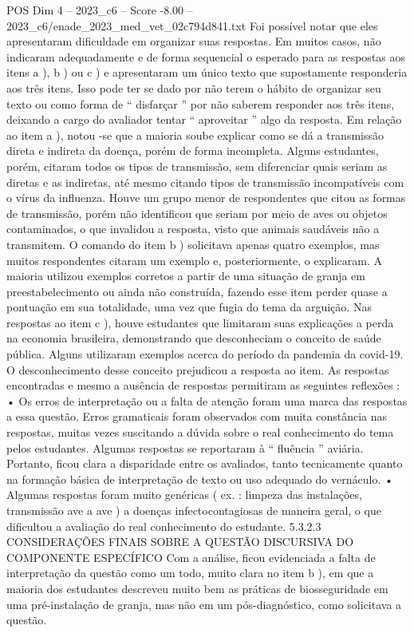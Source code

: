 \begin{textsample}{POS Dim 4 – 2023\_c6 – Score -8.00 – 2023\_c6/enade\_2023\_med\_vet\_02c794d841.txt}
Foi possível notar que eles apresentaram dificuldade em organizar suas respostas.
Em muitos casos, não indicaram adequadamente e de forma sequencial o esperado para as respostas aos itens a ), b ) ou c ) e apresentaram um único texto que supostamente responderia aos três itens.
Isso pode ter se dado por não terem o hábito de organizar seu texto ou como forma de “ disfarçar ” por não saberem responder aos três itens, deixando a cargo do avaliador tentar “ aproveitar ” algo da resposta.
Em relação ao item a ), notou -se que a maioria soube explicar como se dá a transmissão direta e indireta da doença, porém de forma incompleta.
Alguns estudantes, porém, citaram todos os tipos de transmissão, sem diferenciar quais seriam as diretas e as indiretas, até mesmo citando tipos de transmissão incompatíveis com o vírus da influenza.
Houve um grupo menor de respondentes que citou as formas de transmissão, porém não identificou que seriam por meio de aves ou objetos contaminados, o que invalidou a resposta, visto que animais saudáveis não a transmitem.
O comando do item b ) solicitava apenas quatro exemplos, mas muitos respondentes citaram um exemplo e, posteriormente, o explicaram.
A maioria utilizou exemplos corretos a partir de uma situação de granja em preestabelecimento ou ainda não construída, fazendo esse item perder quase a pontuação em sua totalidade, uma vez que fugia do tema da arguição.
Nas respostas ao item c ), houve estudantes que limitaram suas explicações a perda na economia brasileira, demonstrando que desconheciam o conceito de saúde pública.
Alguns utilizaram exemplos acerca do período da pandemia da covid-19.
O desconhecimento desse conceito prejudicou a resposta ao item.
As respostas encontradas e mesmo a ausência de respostas permitiram as seguintes reflexões : • Os erros de interpretação ou a falta de atenção foram uma marca das respostas a essa questão.
Erros gramaticais foram observados com muita constância nas respostas, muitas vezes suscitando a dúvida sobre o real conhecimento do tema pelos estudantes.
Algumas respostas se reportaram à “ fluência ” aviária.
Portanto, ficou clara a disparidade entre os avaliados, tanto tecnicamente quanto na formação básica de interpretação de texto ou uso adequado do vernáculo. • Algumas respostas foram muito genéricas ( ex. : limpeza das instalações, transmissão ave a ave ) a doenças infectocontagiosas de maneira geral, o que dificultou a avaliação do real conhecimento do estudante. 5.3.2.3 CONSIDERAÇÕES FINAIS SOBRE A QUESTÃO DISCURSIVA DO COMPONENTE ESPECÍFICO Com a análise, ficou evidenciada a falta de interpretação da questão como um todo, muito clara no item b ), em que a maioria dos estudantes descreveu muito bem as práticas de biosseguridade em uma pré-instalação de granja, mas não em um pós-diagnóstico, como solicitava a questão.

\end{textsample}
